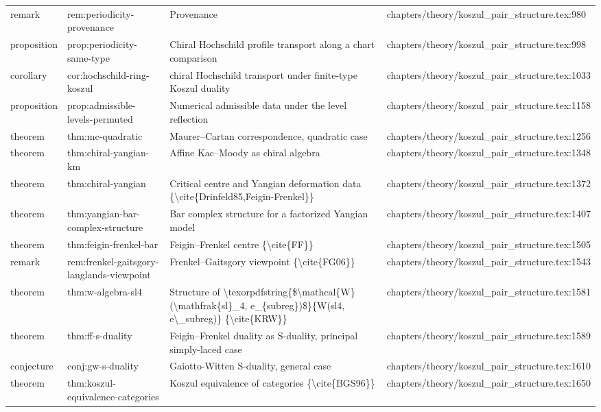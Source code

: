 \documentclass[11pt]{article}
\begin{document}
\begin{longtable}{L{0.10\textwidth}L{0.26\textwidth}L{0.42\textwidth}L{0.22\textwidth}}
remark & rem:periodicity-provenance & Provenance & chapters/theory/koszul\_pair\_structure.tex:980\\
proposition & prop:periodicity-same-type & Chiral Hochschild profile transport along a chart comparison & chapters/theory/koszul\_pair\_structure.tex:998\\
corollary & cor:hochschild-ring-koszul & chiral Hochschild transport under finite-type Koszul duality & chapters/theory/koszul\_pair\_structure.tex:1033\\
proposition & prop:admissible-levels-permuted & Numerical admissible data under the level reflection & chapters/theory/koszul\_pair\_structure.tex:1158\\
theorem & thm:mc-quadratic & Maurer--Cartan correspondence, quadratic case & chapters/theory/koszul\_pair\_structure.tex:1256\\
theorem & thm:chiral-yangian-km & Affine Kac--Moody as chiral algebra & chapters/theory/koszul\_pair\_structure.tex:1348\\
theorem & thm:chiral-yangian & Critical centre and Yangian deformation data \{\textbackslash{}cite\{Drinfeld85,Feigin-Frenkel\}\} & chapters/theory/koszul\_pair\_structure.tex:1372\\
theorem & thm:yangian-bar-complex-structure & Bar complex structure for a factorized Yangian model & chapters/theory/koszul\_pair\_structure.tex:1407\\
theorem & thm:feigin-frenkel-bar & Feigin--Frenkel centre \{\textbackslash{}cite\{FF\}\} & chapters/theory/koszul\_pair\_structure.tex:1505\\
remark & rem:frenkel-gaitsgory-langlands-viewpoint & Frenkel--Gaitsgory viewpoint \{\textbackslash{}cite\{FG06\}\} & chapters/theory/koszul\_pair\_structure.tex:1543\\
theorem & thm:w-algebra-sl4 & Structure of \textbackslash{}texorpdfstring\{\$\textbackslash{}mathcal\{W\}(\textbackslash{}mathfrak\{sl\}\_4, e\_\{subreg\})\$\}\{W(sl4, e\textbackslash{}\_subreg)\} \{\textbackslash{}cite\{KRW\}\} & chapters/theory/koszul\_pair\_structure.tex:1581\\
theorem & thm:ff-s-duality & Feigin--Frenkel duality as S-duality, principal simply-laced case & chapters/theory/koszul\_pair\_structure.tex:1589\\
conjecture & conj:gw-s-duality & Gaiotto-Witten S-duality, general case & chapters/theory/koszul\_pair\_structure.tex:1610\\
theorem & thm:koszul-equivalence-categories & Koszul equivalence of categories \{\textbackslash{}cite\{BGS96\}\} & chapters/theory/koszul\_pair\_structure.tex:1650\\

\end{longtable}
\end{document}
